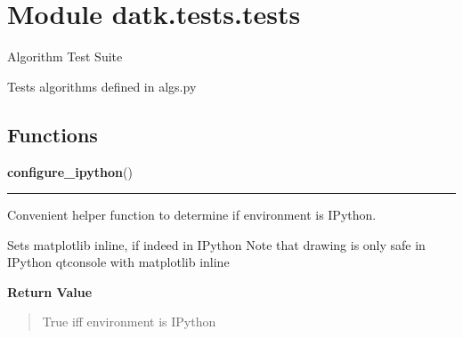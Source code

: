 %
%
%


\section{Module datk.tests.tests}

    \label{datk:tests:tests}
Algorithm Test Suite

Tests algorithms defined in algs.py



  \subsection{Functions}

    \label{datk:tests:tests:configure_ipython}

    \vspace{0.5ex}

\hspace{.8\funcindent}\begin{boxedminipage}{\funcwidth}

    \raggedright \textbf{configure\_ipython}()

    \vspace{-1.5ex}

    \rule{\textwidth}{0.5\fboxrule}
\setlength{\parskip}{2ex}
    Convenient helper function to determine if environment is IPython.

    Sets matplotlib inline, if indeed in IPython Note that drawing is only 
    safe in IPython qtconsole with matplotlib inline

\setlength{\parskip}{1ex}
      \textbf{Return Value}
    \vspace{-1ex}

      \begin{quote}
      True iff environment is IPython

      \end{quote}

    \end{boxedminipage}

